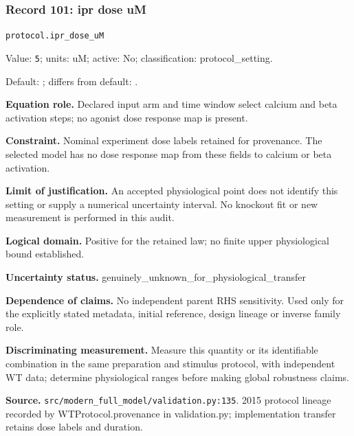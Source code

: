 \subsubsection*{Record 101: ipr dose uM}
{\small \nolinkurl{protocol.ipr_dose_uM}\par

Value: \texttt{5}; units: uM; active: No; classification: protocol\_setting.\par

Default: ; differs from default: .\par

\textbf{Equation role.} Declared input arm and time window select calcium and beta activation steps; no agonist dose response map is present.\par

\textbf{Constraint.} Nominal experiment dose labels retained for provenance. The selected model has no dose response map from these fields to calcium or beta activation.\par

\textbf{Limit of justification.} An accepted physiological point does not identify this setting or supply a numerical uncertainty interval. No knockout fit or new measurement is performed in this audit.\par

\textbf{Logical domain.} Positive for the retained law; no finite upper physiological bound established.\par

\textbf{Uncertainty status.} genuinely\_unknown\_for\_physiological\_transfer\par

\textbf{Dependence of claims.} No independent parent RHS sensitivity. Used only for the explicitly stated metadata, initial reference, design lineage or inverse family role.\par

\textbf{Discriminating measurement.} Measure this quantity or its identifiable combination in the same preparation and stimulus protocol, with independent WT data; determine physiological ranges before making global robustness claims.\par

\textbf{Source.} \nolinkurl{src/modern_full_model/validation.py:135}. 2015 protocol lineage recorded by WTProtocol.provenance in validation.py; implementation transfer retains dose labels and duration.\par}

